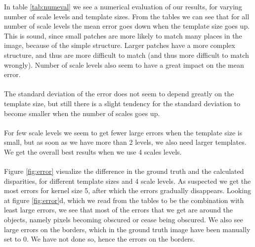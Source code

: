 \documentclass[12pt,a4paper,oneside,final]{article}
\begin{document}
In table \ref{tab:numeval} we see a numerical evaluation of our results, for varying number of scale levels and template sizes. From the tables we can see that for all number of scale levels the mean error goes down when the template size goes up. This is sound, since small patches are more likely to match many places in the image, because of the simple structure. Larger patches have a more complex structure, and thus are more difficult to match (and thus more difficult to match wrongly). Number of scale levels also seem to have a great impact on the mean error.\\\\
The standard deviation of the error does not seem to depend greatly on the template size, but still there is a slight tendency for the standard deviation to become smaller when the number of scales goes up.\\\\
For few scale levels we seem to get fewer large errors when the template size is small, but as soon as we have more than 2 levels, we also need larger templates. We get the overall best results when we use 4 scales levels. \\\\
Figure \ref{fig:error} visualize the difference in the ground truth and the calculated disparities, for different template sizes and 4 scale levels. As suspected we get the most errors for kernel size 5, after which the errors gradually disappears. Looking at figure \ref{fig:error}d, which we read from the tables to be the combination with least large errors, we see that most of the errors that we get are around the objects, namely pixels becoming obscured or cease being obscured. We also see large errors on the borders, which in the ground truth image have been manually set to 0. We have not done so, hence the errors on the borders.
\end{document}
